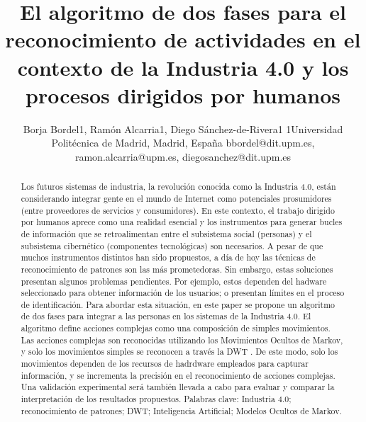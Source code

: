 \documentclass{article}
\title {\textbf{El algoritmo de dos fases para el reconocimiento de actividades en el contexto de la Industria 4.0 y los procesos dirigidos por humanos
}}
\author{Borja Bordel1, Ramón Alcarria1, Diego Sánchez-de-Rivera1 1Universidad Politécnica de Madrid, Madrid, España bbordel@dit.upm.es, ramon.alcarria@upm.es, diegosanchez@dit.upm.es}
\begin{document}
\maketitle

\begin{abstract}
Los futuros sistemas de industria, la revolución conocida como la Industria 4.0, están considerando integrar gente en el mundo de Internet como potenciales prosumidores (entre proveedores de servicios y consumidores). En este contexto, el trabajo dirigido por humanos aprece como una realidad esencial y los instrumentos para generar bucles  de información que se retroalimentan entre el subsistema social (personas) y el subsistema cibernético (componentes tecnológicas) son necesarios. A pesar de que muchos instrumentos distintos han sido propuestos, a día de hoy las técnicas de reconocimiento de patrones son las más prometedoras. Sin embargo, estas soluciones presentan algunos problemas pendientes. Por ejemplo, estos dependen del hadware seleccionado para obtener información de los usuarios; o presentan límites en el proceso de identificación. Para abordar esta situación, en este paper se propone un algoritmo de dos fases para integrar a las personas en los sistemas de la Industria 4.0. El algoritmo define acciones complejas como una composición de simples movimientos. Las acciones complejas son reconocidas utilizando los Movimientos Ocultos de Markov, y solo los movimientos simples se reconocen a través la DWT . De este modo, solo los movimientos dependen de los recursos de hadrdware empleados para capturar información, y se incrementa  la precisión en el reconocimiento de acciones complejas. Una validación experimental será también llevada a cabo para evaluar y comparar la interpretación de los resultados propuestos.
Palabras clave: Industria 4.0; reconocimiento de patrones; DWT; Inteligencia Artificial; Modelos Ocultos de Markov.
\end{abstract}
\end{document}
